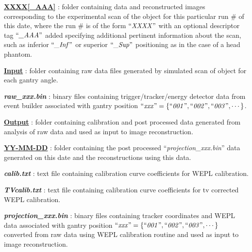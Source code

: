 \documentclass[landscape]{article}
\begin{document}
\begin{myEnumerate}[labelindent=0pt, leftmargin=*]
\begin{myEnumerate}[labelindent=1pt, leftmargin=*]
\begin{myEnumerate}[labelindent=1pt, leftmargin=*]
            \begin{myEnumerate}[labelindent=1pt, leftmargin=*]
                \item \ul{\textbf{XXXX[\_AAA]}} : folder containing data and reconstructed images corresponding to the experimental scan of the object for this particular run \# of this date, where the run \# is of the form $\textrm{``\textit{XXXX}''}$ with an optional descriptor tag $\textrm{``\textit{\_AAA}''}$ added specifying additional pertinent information about the scan, such as inferior $\textrm{``\textit{\_Inf}''}$ or superior $\textrm{``\textit{\_Sup}''}$ positioning as in the case of a head phantom.
                \begin{myEnumerate}[labelindent=1pt, leftmargin=*]
                    \item \ul{\textbf{Input}} : folder containing raw data files generated by simulated scan of object for each gantry angle.
                    \begin{myEnumerate}[labelindent=1pt, leftmargin=*]
                        \item \textbf{\textit{raw\_xxx.bin}} : binary files containing trigger/tracker/energy detector data from event builder associated with gantry position $\textrm{``\textit{xxx}''} =\{\textrm{``\textit{001}''}, \textrm{``\textit{002}''}, \textrm{``\textit{003}''}, \cdots\}$.
                    \end{myEnumerate}
                    \item \ul{\textbf{Output}} : folder containing calibration and post processed data generated from analysis of raw data and used as input to image reconstruction.
                    \begin{myEnumerate}[labelindent=1pt, leftmargin=*]
                        \item \ul{\textbf{YY-MM-DD}} : folder containing the post processed ``\textit{projection\_xxx.bin}'' data generated on this date and the reconstructions using this data.
                        \begin{myEnumerate}[labelindent=1pt, leftmargin=*]
                            \item \textbf{\textit{calib.txt}} : text file containing calibration curve coefficients for WEPL calibration.
                            \item \textbf{\textit{TVcalib.txt}} : text file containing calibration curve coefficients for tv corrected WEPL calibration.
                            \item \textbf{\textit{projection\_xxx.bin}} : binary files containing tracker coordinates and WEPL data associated with gantry position $\textrm{``\textit{xxx}''} =\{\textrm{``\textit{001}''}, \textrm{``\textit{002}''}, \textrm{``\textit{003}''}, \cdots\}$ converted from raw data using WEPL calibration routine and used as input to image reconstruction.

\end{myEnumerate}
\end{myEnumerate}
\end{myEnumerate}
\end{myEnumerate}
\end{myEnumerate}
\end{myEnumerate}
\end{myEnumerate}
\end{document}
